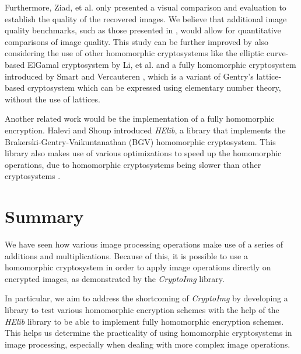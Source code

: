 Furthermore, Ziad, et al. only presented a visual comparison and evaluation to establish the quality of the recovered images. We believe that additional image quality benchmarks, such as those presented in \cite{ahmed_benchmark_2016, ahmad_efficiency_2012}, would allow for quantitative comparisons of image quality.
This study can be further improved by also considering the use of other homomorphic cryptosystems like the elliptic curve-based ElGamal cryptosystem by Li, et al. \cite{li_elliptic_2012} and a fully homomorphic cryptosystem introduced by Smart and Vercauteren \cite{hutchison_fully_2010}, which is a variant of Gentry's lattice-based cryptosystem which can be expressed using elementary number theory, without the use of lattices.

Another related work would be the implementation of a fully homomorphic encryption. Halevi and Shoup \cite{garay_algorithms_2014} introduced \textit{HElib}, a library that implements the Brakerski-Gentry-Vaikuntanathan (BGV) homomorphic cryptosystem. This library also makes use of various optimizations to speed up the homomorphic operations, due to homomorphic cryptosystems being slower than other cryptosystems \cite{sen_homomorphic_2013}.

\section{Summary}
We have seen how various image processing operations make use of a series of additions and multiplications. Because of this, it is possible to use a homomorphic cryptosystem in order to apply image operations directly on encrypted images, as demonstrated by the \textit{CryptoImg} library.

In particular, we aim to address the shortcoming of \textit{CryptoImg} by developing a library to test various homomorphic encryption schemes with the help of the \textit{HElib} library to be able to implement fully homomorphic encryption schemes. This helps us determine the practicality of using homomorphic cryptosystems in image processing, especially when dealing with more complex image operations.
